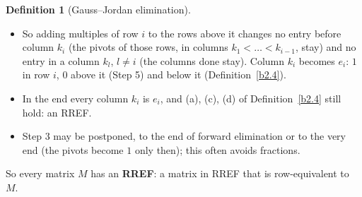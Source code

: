 \documentclass[12pt]{article}
\theoremstyle{definition}
\newtheorem{definition}[theorem]{Definition}
\begin{document}
\begin{definition}[Gauss--Jordan elimination]
\begin{itemize}
are done, so row \(i\) is \(0\) in columns \(k_{i+1},\dots,k_r\); it is \(0\) before column \(k_i\).
\item So adding multiples of row \(i\) to the rows above it changes no entry before column \(k_i\) (the pivots of
those rows, in columns \(k_1<\dots<k_{i-1}\), stay) and no entry in a column \(k_l\), \(l\ne i\) (the columns done
stay). Column \(k_i\) becomes \(e_i\): \(1\) in row \(i\), \(0\) above it (Step 5) and below it (Definition~\ref{b2.4}).
\item In the end every column \(k_i\) is \(e_i\), and (a), (c), (d) of Definition~\ref{b2.4} still hold: an RREF.
\item Step 3 may be postponed, to the end of forward elimination or to the very end (the pivots become \(1\) only
then); this often avoids fractions.
\end{itemize}
So every matrix \(M\) has an \textbf{RREF}: a matrix in RREF that is row-equivalent to \(M\).
\end{definition}
\end{document}
